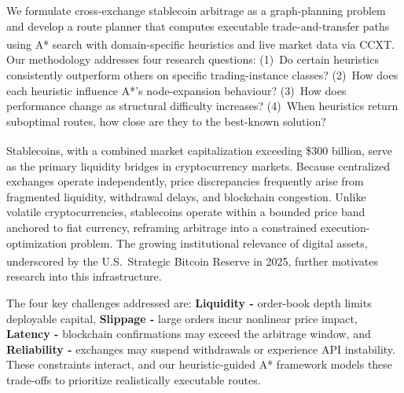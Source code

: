 We formulate cross-exchange stablecoin arbitrage as a graph-planning problem and develop a route planner that computes executable trade-and-transfer paths using A* search with domain-specific heuristics and live market data via CCXT\textsuperscript{\cite{ccxt2024}}. Our methodology addresses four research questions: (1)~Do certain heuristics consistently outperform others on specific trading-instance classes? (2)~How does each heuristic influence A*'s node-expansion behaviour? (3)~How does performance change as structural difficulty increases? (4)~When heuristics return suboptimal routes, how close are they to the best-known solution?

Stablecoins, with a combined market capitalization exceeding \$300 billion\textsuperscript{\cite{coinmarketcap2025stablecoin}}, serve as the primary liquidity bridges in cryptocurrency markets. Because centralized exchanges operate independently, price discrepancies frequently arise from fragmented liquidity, withdrawal delays, and blockchain congestion. Unlike volatile cryptocurrencies, stablecoins operate within a bounded price band anchored to fiat currency, reframing arbitrage into a constrained execution-optimization problem. The growing institutional relevance of digital assets, underscored by the U.S.\ Strategic Bitcoin Reserve in 2025\textsuperscript{\cite{whitehouse2025reserve}}, further motivates research into this infrastructure.

The four key challenges addressed are: \textbf{Liquidity -} order-book depth limits deployable capital, 
\textbf{Slippage -} large orders incur nonlinear price impact, 
\textbf{Latency -} blockchain confirmations may exceed the arbitrage window, and 
\textbf{Reliability -} exchanges may suspend withdrawals or experience API instability.
These constraints interact, and our heuristic-guided A* framework models these trade-offs to prioritize realistically executable routes.
